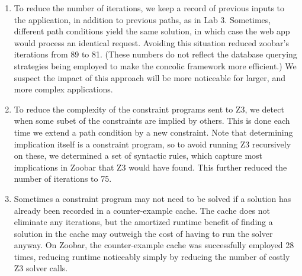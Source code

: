\documentclass{article}
\begin{document}
\begin{enumerate}
\item To reduce the number of iterations, we keep a record of previous
  inputs to the application, in addition to previous paths, as in Lab 3. Sometimes,
  different path conditions yield the same solution, in which case
  the web app would process an identical request. Avoiding this
  situation reduced zoobar's iterations from 89 to 81. (These numbers
  do not reflect the database querying strategies being employed
  to make the concolic framework more efficient.) We suspect the impact of this
  approach will be more noticeable for larger, and more complex applications.

\item To reduce the complexity of the constraint programs sent to Z3,
  we detect when some subet of the constraints are implied by others. This is done each
  time we extend a path condition by a new constraint. Note that
  determining implication itself is a constraint program, so to avoid
  running Z3 recursively on these, we determined a set of syntactic rules, which
  capture most implications in Zoobar that Z3 would have found. This
  further reduced the number of iterations to 75.

\item Sometimes a constraint program may not need to be solved if a
  solution has already been recorded in a counter-example cache. The
  cache does not eliminate any iterations, but the amortized runtime
  benefit of finding a solution in the cache may outweigh the cost of
  having to run the solver anyway. On Zoobar, the counter-example
  cache was successfully employed 28 times, reducing runtime noticeably simply
  by reducing the number of costly Z3 solver calls.
\end{enumerate}
\end{document}
